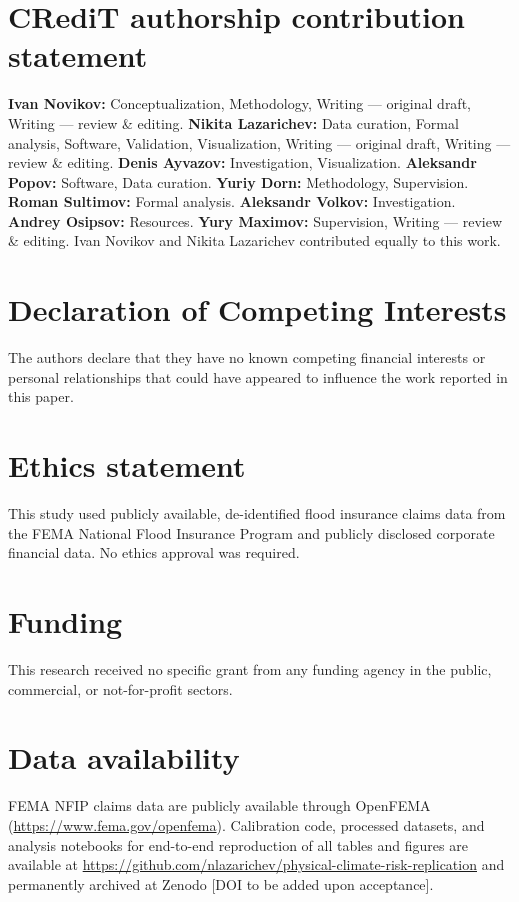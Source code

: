 \documentclass[preprint,12pt,authoryear]{elsarticle}
\begin{document}
\section*{CRediT authorship contribution statement}
\textbf{Ivan Novikov:} Conceptualization, Methodology, Writing --- original draft, Writing --- review \& editing.
\textbf{Nikita Lazarichev:} Data curation, Formal analysis, Software, Validation, Visualization, Writing --- original draft, Writing --- review \& editing.
\textbf{Denis Ayvazov:} Investigation, Visualization.
\textbf{Aleksandr Popov:} Software, Data curation.
\textbf{Yuriy Dorn:} Methodology, Supervision.
\textbf{Roman Sultimov:} Formal analysis.
\textbf{Aleksandr Volkov:} Investigation.
\textbf{Andrey Osipsov:} Resources.
\textbf{Yury Maximov:} Supervision, Writing --- review \& editing.
Ivan Novikov and Nikita Lazarichev contributed equally to this work.

\section*{Declaration of Competing Interests}
The authors declare that they have no known competing financial interests or personal relationships that could have appeared to influence the work reported in this paper.

\section*{Ethics statement}
This study used publicly available, de-identified flood insurance claims data from the FEMA National Flood Insurance Program and publicly disclosed corporate financial data. No ethics approval was required.

\section*{Funding}
This research received no specific grant from any funding agency in the public, commercial, or not-for-profit sectors.

\section*{Data availability}
FEMA NFIP claims data are publicly available through OpenFEMA (\url{https://www.fema.gov/openfema}). Calibration code, processed datasets, and analysis notebooks for end-to-end reproduction of all tables and figures are available at \url{https://github.com/nlazarichev/physical-climate-risk-replication} and permanently archived at Zenodo [DOI to be added upon acceptance].
\end{document}

